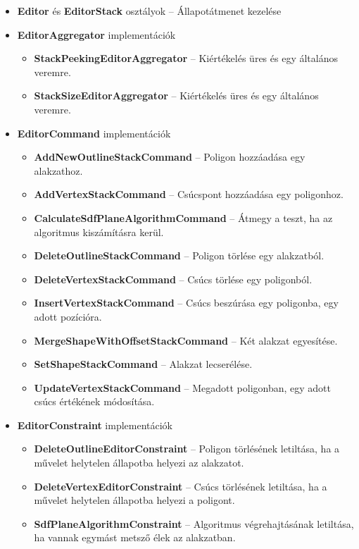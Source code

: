 \begin{itemize}
	\item \textbf{Editor} és \textbf{EditorStack} osztályok -- Állapotátmenet kezelése
	\item \textbf{EditorAggregator} implementációk
	\begin{itemize}
		\item \textbf{StackPeekingEditorAggregator} -- Kiértékelés üres és egy általános veremre.
		\item \textbf{StackSizeEditorAggregator} -- Kiértékelés üres és egy általános veremre.
	\end{itemize}
	\item \textbf{EditorCommand} implementációk
	\begin{itemize}
		\item \textbf{AddNewOutlineStackCommand} -- Poligon hozzáadása egy alakzathoz.
		\item \textbf{AddVertexStackCommand} -- Csúcspont hozzáadása egy poligonhoz.
		\item \textbf{CalculateSdfPlaneAlgorithmCommand} -- Átmegy a teszt, ha az algoritmus kiszámításra kerül.
		\item \textbf{DeleteOutlineStackCommand} -- Poligon törlése egy alakzatból.
		\item \textbf{DeleteVertexStackCommand} -- Csúcs törlése egy poligonból.
		\item \textbf{InsertVertexStackCommand} -- Csúcs beszúrása egy poligonba, egy adott pozícióra.
		\item \textbf{MergeShapeWithOffsetStackCommand} -- Két alakzat egyesítése.
		\item \textbf{SetShapeStackCommand} -- Alakzat lecserélése.
		\item \textbf{UpdateVertexStackCommand} -- Megadott poligonban, egy adott csúcs értékének módosítása.
	\end{itemize}
	\item \textbf{EditorConstraint} implementációk
	\begin{itemize}
		\item \textbf{DeleteOutlineEditorConstraint} -- Poligon törlésének letiltása, ha a művelet helytelen állapotba helyezi az alakzatot.
		\item \textbf{DeleteVertexEditorConstraint} -- Csúcs törlésének letiltása, ha a művelet helytelen állapotba helyezi a poligont.
		\item \textbf{SdfPlaneAlgorithmConstraint} -- Algoritmus végrehajtásának letiltása, ha vannak egymást metsző élek az alakzatban.

\end{itemize}
\end{itemize}
